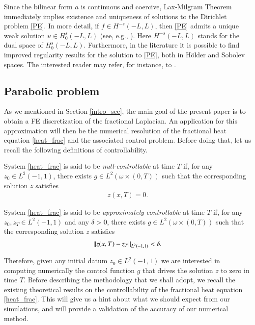 Since the bilinear form $a$ is continuous and coercive, Lax-Milgram Theorem immediately implies existence and uniqueness of solutions to the Dirichlet problem \eqref{PE}. In more detail, if $f\in H^{-s}(-L,L)$, then \eqref{PE} admits a unique weak solution $u\in H_0^s(-L,L)$ (see, e.g., \cite[Proposition 2.1]{biccari2017local}). Here $H^{-s}(-L,L)$ stands for the dual space of $H^s_0(-L,L)$. Furthermore, in the literature it is possible to find improved regularity results for the solution to \eqref{PE}, both in H\"older and Sobolev spaces. The interested reader may refer, for instance, to \cite{acosta2017fractional,biccari2017local,leonori2015basic,ros2014dirichlet,ros2014extremal}.

\subsection{Parabolic problem}

As we mentioned in Section \ref{intro_sec}, the main goal of the present paper is to obtain a FE discretization of the fractional Laplacian. An application for this approximation will then be the numerical resolution of the fractional heat equation \eqref{heat_frac} and the associated control problem. Before doing that, let us recall the following definitions of controllability.

\begin{definition}
System \eqref{heat_frac} is said to be \textit{null-controllable} at time $T$ if, for any $z_0\in L^2(-1,1)$, there exists $g\in L^2(\omega\times(0,T))$ such that the corresponding solution $z$ satisfies 
\begin{align*}
	z(x,T)=0.
\end{align*}

\end{definition}

\begin{definition}
System \eqref{heat_frac} is said to be \textit{approximately controllable} at time $T$ if, for any $z_0,z_T\in L^2(-1,1)$ and any $\delta>0$, there exists $g\in L^2(\omega\times(0,T))$ such that the corresponding solution $z$ satisfies \begin{align*}
	{\left\|z(x,T)-z_T\right\|}_{L^2(-1,1)}<\delta.
\end{align*}
\end{definition}

Therefore, given any initial datum $z_0\in L^2(-1,1)$ we are interested in computing numerically the control function $g$ that drives the solution $z$ to zero in time $T$. Before describing the methodology that we shall adopt, we recall the existing theoretical results on the controllability of the fractional heat equation \eqref{heat_frac}. This will give us a hint about what we should expect from our simulations, and will provide a validation of the accuracy of our numerical method.

